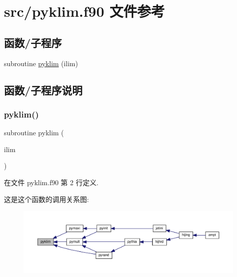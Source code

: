 \hypertarget{pyklim_8f90}{}\section{src/pyklim.f90 文件参考}
\label{pyklim_8f90}
\subsection*{函数/子程序}
\begin{DoxyCompactItemize}
\item 
subroutine \mbox{\hyperlink{pyklim_8f90_a869af0bd5290e281436af56e184a5012}{pyklim}} (ilim)
\end{DoxyCompactItemize}


\subsection{函数/子程序说明}
\mbox{\label{pyklim_8f90_a869af0bd5290e281436af56e184a5012}} 
\subsubsection{\texorpdfstring{pyklim()}{pyklim()}}
{\footnotesize\ttfamily subroutine pyklim (\begin{DoxyParamCaption}\item[{}]{ilim }\end{DoxyParamCaption})}



在文件 pyklim.\+f90 第 2 行定义.

这是这个函数的调用关系图\+:
\nopagebreak
\begin{figure}[H]
\begin{center}
\leavevmode
\includegraphics[width=350pt]{pyklim_8f90_a869af0bd5290e281436af56e184a5012_icgraph}
\end{center}
\end{figure}
